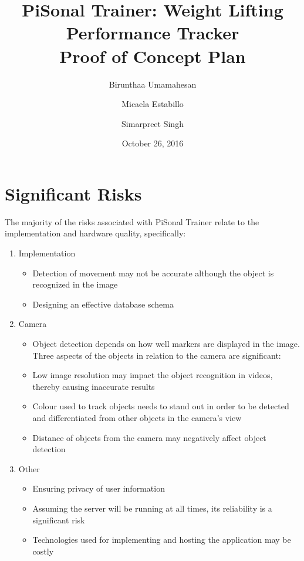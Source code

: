 \documentclass{article}
\title{
PiSonal Trainer: Weight Lifting Performance Tracker\\
\Large {Proof of Concept Plan}
}
\date{October 26, 2016}
\author{Birunthaa Umamahesan \and Micaela Estabillo \and Simarpreet Singh}
\begin{document}
\thispagestyle{plain}
\maketitle


\section*{Significant Risks}
The majority of the risks associated with PiSonal Trainer relate to the implementation and hardware quality, specifically:
\begin{enumerate}
    \item Implementation
    \begin{itemize}
        \item Detection of movement may not be accurate although the object is recognized in the image
        \item Designing an effective database schema
    \end{itemize}
    \item Camera
    \begin{itemize}
        \item Object detection depends on how well markers are displayed in the image. Three aspects of the objects in relation to the camera are significant:
        \item Low image resolution may impact the object recognition in videos, thereby causing inaccurate results
        \item Colour used to track objects needs to stand out in order to be detected and differentiated from other objects in the camera’s view
        \item Distance of objects from the camera may negatively affect object detection
    \end{itemize}
    \item Other 
    \begin{itemize}
        \item Ensuring privacy of user information
        \item Assuming the server will be running at all times, its reliability is a significant risk
        \item Technologies used for implementing and hosting the application may be costly
    \end{itemize}
\end{enumerate}
\end{document}
